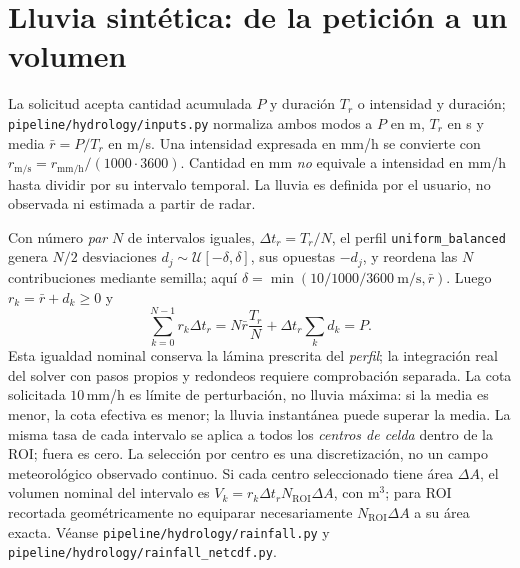 \documentclass[11pt,a4paper]{article}
\newcommand{\src}[1]{\nolinkurl{#1}}
\newcommand{\unit}[1]{\mathrm{#1}}
\begin{document}
\section{Lluvia sintética: de la petición a un volumen}
\label{sec:lluvia}
La solicitud acepta cantidad acumulada $P$ y duración $T_r$ o intensidad y duración; \src{pipeline/hydrology/inputs.py} normaliza ambos modos a $P$ en m, $T_r$ en s y media $\bar r=P/T_r$ en m/s. Una intensidad expresada en mm/h se convierte con $r_{\mathrm{m/s}}=r_{\mathrm{mm/h}}/(1000\cdot3600)$. Cantidad en mm \emph{no} equivale a intensidad en mm/h hasta dividir por su intervalo temporal. La lluvia es definida por el usuario, no observada ni estimada a partir de radar.

Con número \emph{par} $N$ de intervalos iguales, $\Delta t_r=T_r/N$, el perfil \texttt{uniform\_balanced} genera $N/2$ desviaciones $d_j\sim\mathcal U[-\delta,\delta]$, sus opuestas $-d_j$, y reordena las $N$ contribuciones mediante semilla; aquí $\delta=\min(10/1000/3600\ \unit{m/s},\bar r)$. Luego $r_k=\bar r+d_k\geq0$ y
\begin{equation}
 \sum_{k=0}^{N-1}r_k\Delta t_r
 =N\bar r\frac{T_r}{N}+\Delta t_r\sum_kd_k=P.\label{eq:rainbal}
\end{equation}
Esta igualdad nominal conserva la lámina prescrita del \emph{perfil}; la integración real del solver con pasos propios y redondeos requiere comprobación separada. La cota solicitada $10$\,mm/h es límite de perturbación, no lluvia máxima: si la media es menor, la cota efectiva es menor; la lluvia instantánea puede superar la media. La misma tasa de cada intervalo se aplica a todos los \emph{centros de celda} dentro de la ROI; fuera es cero. La selección por centro es una discretización, no un campo meteorológico observado continuo. Si cada centro seleccionado tiene área $\Delta A$, el volumen nominal del intervalo es $V_k=r_k\Delta t_r N_{\mathrm{ROI}}\Delta A$, con m$^3$; para ROI recortada geométricamente no equiparar necesariamente $N_{\mathrm{ROI}}\Delta A$ a su área exacta. Véanse \src{pipeline/hydrology/rainfall.py} y \src{pipeline/hydrology/rainfall_netcdf.py}.
\end{document}

